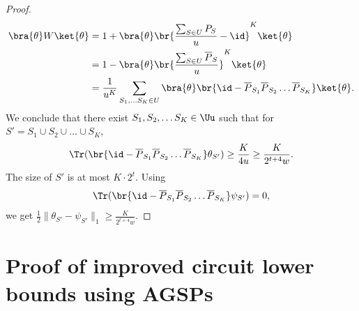 \documentclass[11pt]{article}
\begin{document}
\begin{proof}
\begin{align}
\bra{\theta}W\ket{\theta}&= 1+\bra{\theta}\br{\frac{\sum_{S\in U}P_S}{u}-\id}^K\ket{\theta}\\
&=1-\bra{\theta}\br{\frac{\sum_{S\in U}\overline{P}_S}{u}}^K\ket{\theta}\\
&=\frac{1}{u^K}\sum_{S_1, \ldots S_K\in U}\bra{\theta}\br{\id-\overline{P}_{S_1}\overline{P}_{S_2}\ldots \overline{P}_{S_K}}\ket{\theta}.
\end{align}
 We conclude that there exist $S_1,S_2, \ldots S_K\in \Uu$ such that for $S' =  S_1 \cup S_2 \cup \ldots \cup S_K$,
\begin{align}\Tr(\br{\id-\overline{P}_{S_1}\overline{P}_{S_2}\ldots \overline{P}_{S_K}}\theta_{S'}) \geq \frac{K}{4u}\geq \frac{K}{2^{t+4}w}.
\end{align}
The size of $S'$ is at most $K\cdot 2^t$.
Using 
\begin{align}\Tr(\br{\id-\overline{P}_{S_1}\overline{P}_{S_2}\ldots \overline{P}_{S_K}}\psi_{S'})=0,
\end{align} we get $\frac{1}{2}\|\theta_{S'}-\psi_{S'}\|_1\geq \frac{K}{2^{t+4}w}$.
\end{proof}


\section{Proof of improved circuit lower bounds using AGSPs}
\label{sec:appendix-pf}
\end{document}
